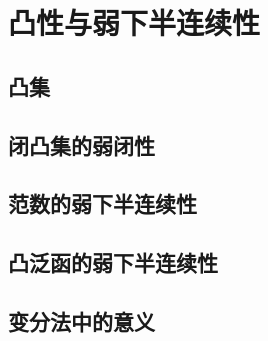\section{凸性与弱下半连续性}
\label{b1:sec:0905}


\subsection{凸集}
\label{b1:subsec:090501}

\subsection{闭凸集的弱闭性}
\label{b1:subsec:090502}

\subsection{范数的弱下半连续性}
\label{b1:subsec:090503}

\subsection{凸泛函的弱下半连续性}
\label{b1:subsec:090504}

\subsection{变分法中的意义}
\label{b1:subsec:090505}


